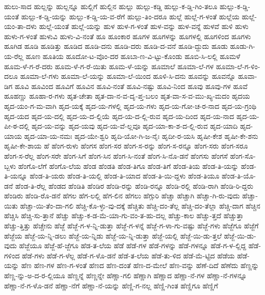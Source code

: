 {ಹುಲು-ಸಾದ
ಹುಲ್ಲನ್ನು
ಹುಲ್ಲನ್ನೂ
ಹುಲ್ಲಿಗೆ
ಹುಲ್ಲಿನ
ಹುಲ್ಲು
ಹುಲ್ಲು-ಕಡ್ಡಿ
ಹುಲ್ಲು-ಕ-ಡ್ಡಿ-ಗಿಂ-ತಲೂ
ಹುಲ್ಲು-ಕ-ಡ್ಡಿ-ಯಂತೆ
ಹುಲ್ಲು-ಕ-ಡ್ಡಿ-ಯನ್ನು
ಹುಲ್ಲು-ಕ-ಡ್ಡಿ-ಯ-ವ-ರೆಗೆ
ಹುಲ್ಲು-ತಿಂ-ದರೂ
ಹುಲ್ಲೆ
ಹುಲ್ಲೆ-ಗ-ಳಂತೆ
ಹುಲ್ಲೆಯ
ಹುಲ್ಲೆ-ಯಂ-ತಾ-ದಳು
ಹುಲ್ಲೆ-ಯಂತೆ
ಹುಲ್ಲೆ-ಯನ್ನು
ಹುಳ
ಹುಳ-ಗ-ಳಂತೆ
ಹುಳ-ವನ್ನು
ಹುಳ-ವನ್ನೆ
ಹುಳವೆ
ಹುಳಿ
ಹುಳು
ಹುಳು-ಗ-ಳಂತೆ
ಹುಳುವಿ
ಹುಳು-ವಿ-ನಂತೆ
ಹೂ
ಹೂಂಕಾರ
ಹೂಗಳ
ಹೂಗಳನ್ನು
ಹೂಗಳಲ್ಲಿ
ಹೂಗಳಿಂದ
ಹೂಗಳು
ಹೂಗಿಡ
ಹೂಡಿ
ಹೂಡಿತ್ತು
ಹೂಡಿದ
ಹೂಡಿ-ದನು
ಹೂಡಿ-ದರು
ಹೂಡಿ-ದ-ವನೆ
ಹೂಡಿ-ದ್ದುದು
ಹೂಡು
ಹೂಡು-ಗಿ-ಯ-ರೆಲ್ಲ
ಹೂಣ
ಹೂತಿಯ
ಹೂದೋ-ಟ-ವೊಂ-ದರ
ಹೂಬಾ-ಣ-ವಿ-ಟ್ಟು-ಕೊಂಡು
ಹೂಬಿ-ಸಿ-ಲಲ್ಲಿ
ಹೂಮಳೆ
ಹೂಮ-ಳೆ-ಗ-ರೆ-ದರು
ಹೂಮ-ಳೆ-ಗ-ರೆ-ಯಿತು
ಹೂಮ-ಳೆ-ಯನ್ನು
ಹೂಮಾಲೆ
ಹೂಮಾ-ಲೆ-ಗಳ
ಹೂಮಾ-ಲೆ-ಗ-ಳಿಂ-ದಲೂ
ಹೂಮಾ-ಲೆ-ಗಳು
ಹೂಮಾ-ಲೆ-ಯನ್ನು
ಹೂಮಾ-ಲೆ-ಯಿಂದ
ಹೂಳಿ-ಸಿ-ದನು
ಹೂವನ್ನು
ಹೂವನ್ನೊ
ಹೂವಾ-ಡಿಗ
ಹೂವಿ
ಹೂವಿಂದ
ಹೂವಿಗೆ
ಹೂವಿನ
ಹೂವಿ-ನಂತೆ
ಹೂವಿ-ನಷ್ಟು
ಹೂವಿ-ನಿಂದ
ಹೂವು
ಹೂವು-ಗಳ
ಹೂವೆ
ಹೂಹಣ್ಣು
ಹೂಹಾ-ರ-ಗಳು
ಹೃತ-ಚೇತಾ
ಹೃತ-ದಾ-ನ-ವ-ದೃ-ಪ್ತ-ಬಲಂ
ಹೃತ-ವಾ-ಸ-ವ-ಮು-ಖ್ಯ-ಮದಂ
ಹೃದಯ
ಹೃದ-ಯಂ-ಗ-ಮ-ವಾಗಿ
ಹೃದ-ಯಕ್ಕೆ
ಹೃದ-ಯ-ಗಳಲ್ಲಿ
ಹೃದ-ಯ-ಗಳು
ಹೃದ-ಯ-ಗೋ-ಚ-ರ-ನಾದ
ಹೃದ-ಯ-ಗ್ರಂಥಿ
ಹೃದ-ಯದ
ಹೃದ-ಯ-ದಲ್ಲಿ
ಹೃದ-ಯ-ದ-ಲ್ಲಿಯೆ
ಹೃದ-ಯ-ದ-ಲ್ಲಿ-ರುವ
ಹೃದ-ಯ-ದಿಂದ
ಹೃದ-ಯ-ನಾದ
ಹೃದ-ಯ-ಪೀ-ಠ-ದಲ್ಲಿ
ಹೃದ-ಯ-ವನ್ನು
ಹೃದ-ಯವು
ಹೃದ-ಯ-ವೆ-ಲ್ಲವೂ
ಹೃದ-ಯಾ-ಕಾ-ಶ-ದ-ಲ್ಲಿ-ರುವ
ಹೃದ-ಯಾದಿ
ಹೃದ-ಯಾಯ
ಹೃದ-ಯಾ-ಯ-ನಮಃ
ಹೃದ-ಯೇ-ಶ್ವರಿ
ಹೃದಿ-ಯೋ-ಗಿ-ಜ-ನೈಃ
ಹೃದೀ-ರ-ಯಸಿ
ಹೃಷೀ-ಕೇಶ
ಹೃಷೀ-ಕೇ-ಶನು
ಹೃಷೀ-ಕೇ-ಶಾಯ
ಹೆ
ಹೆಂಗ-ರುಳು
ಹೆಂಗಸ
ಹೆಂಗ-ಸರ
ಹೆಂಗ-ಸ-ರನ್ನು
ಹೆಂಗ-ಸ-ರನ್ನೂ
ಹೆಂಗ-ಸರು
ಹೆಂಗ-ಸರೂ
ಹೆಂಗ-ಸ-ರೆಲ್ಲ
ಹೆಂಗ-ಸರೇ
ಹೆಂಗ-ಸಿಗೆ
ಹೆಂಗ-ಸಿನ
ಹೆಂಗ-ಸಿ-ನಂತೆ
ಹೆಂಗ-ಸಿ-ನೊ-ಡನೆ
ಹೆಂಗಸು
ಹೆಂಗಸೆ
ಹೆಂಗ-ಸೊ-ಬ್ಬಳು
ಹೆಂಗೊ-ಲೆಗೆ
ಹೆಂಗೊ-ಲೆಯ
ಹೆಂಡ
ಹೆಂಡತಿ
ಹೆಂಡ-ತಿಗೂ
ಹೆಂಡ-ತಿಗೆ
ಹೆಂಡ-ತಿಯ
ಹೆಂಡ-ತಿ-ಯನ್ನು
ಹೆಂಡ-ತಿ-ಯನ್ನೂ
ಹೆಂಡ-ತಿ-ಯರು
ಹೆಂಡ-ತಿ-ಯಲ್ಲಿ
ಹೆಂಡ-ತಿ-ಯಾದ
ಹೆಂಡ-ತಿ-ಯಿ-ದ್ದಳು
ಹೆಂಡ-ತಿಯೂ
ಹೆಂಡ-ತಿ-ಯೊ-ಡನೆ
ಹೆಂಡ-ತಿ-ರೆಲ್ಲ
ಹೆಂಡದ
ಹೆಂಡಿತಿ
ಹೆಂಡಿರ
ಹೆಂಡಿ-ರನ್ನು
ಹೆಂಡಿ-ರನ್ನೂ
ಹೆಂಡಿ-ರಲ್ಲಿ
ಹೆಂಡಿ-ರಾಗಿ
ಹೆಂಡಿ-ರಿ-ದ್ದರು
ಹೆಂಡಿರು
ಹೆಂಡಿ-ರೊ-ಡನೆ
ಹೆಗಲ
ಹೆಗ-ಲಲ್ಲಿ
ಹೆಗ-ಲಿನ
ಹೆಗಲು
ಹೆಗ್ಗುರಿ
ಹೆಚ್ಚಾ
ಹೆಚ್ಚಾಗಿ
ಹೆಚ್ಚಾ-ಗಿ-ರು-ವುದು
ಹೆಚ್ಚಾ-ಯಿತು
ಹೆಚ್ಚಾ-ಯಿ-ತೆಂ-ದಾ-ಗಲಿ
ಹೆಚ್ಚಿ-ಕೊ-ಳ್ಳು-ವು-ದಕ್ಕೆ
ಹೆಚ್ಚಿತು
ಹೆಚ್ಚಿ-ದಂ-ತೆಲ್ಲ
ಹೆಚ್ಚಿ-ದಂ-ತೆಲ್ಲಾ
ಹೆಚ್ಚಿ-ದಾಗ
ಹೆಚ್ಚಿನ
ಹೆಚ್ಚಿಸಿ
ಹೆಚ್ಚಿ-ಸು-ತ್ತಾನೆ
ಹೆಚ್ಚು
ಹೆಚ್ಚು-ಕ-ಡ-ಮೆ-ಯಾ-ಗು-ವಂ-ತ-ಹು-ದಲ್ಲ
ಹೆಚ್ಚು-ಕಾಲ
ಹೆಚ್ಚು-ತ್ತದೆ
ಹೆಚ್ಚುತ್ತಾ
ಹೆಚ್ಚು-ತ್ತಿತ್ತು
ಹೆಚ್ಚೇನು
ಹೆಜ್ಜೆ
ಹೆಜ್ಜೆ-ಗ-ಳ-ನ್ನಿ-ಡುತ್ತಾ
ಹೆಜ್ಜೆ-ಗ-ಳನ್ನೆ
ಹೆಜ್ಜೆ-ಗ-ಳಾ-ಗು-ವಷ್ಟು
ಹೆಜ್ಜೆ-ಗಳು
ಹೆಜ್ಜೆಗೂ
ಹೆಜ್ಜೆಗೆ
ಹೆಜ್ಜೆಯ
ಹೆಜ್ಜೆ-ಯ-ನ್ನಿ-ಡಲು
ಹೆಜ್ಜೆ-ಯ-ನ್ನಿಡು
ಹೆಜ್ಜೆ-ಯ-ನ್ನಿ-ಡುತ್ತಾ
ಹೆಜ್ಜೆ-ಯಲ್ಲಿ
ಹೆಜ್ಜೆ-ಯಿ-ಡು-ತ್ತಲೆ
ಹೆಜ್ಜೆ-ಯಿ-ಡು-ವುದು
ಹೆಜ್ಜೆಯೂ
ಹೆಜ್ಜೆ-ಹೆ-ಜ್ಜೆಗೂ
ಹೆಡ-ತ-ಲೆಯ
ಹೆಡೆ
ಹೆಡೆ-ಗಳ
ಹೆಡೆ-ಗಳನ್ನು
ಹೆಡೆ-ಗಳನ್ನೂ
ಹೆಡೆ-ಗ-ಳ-ಲ್ಲಿದ್ದ
ಹೆಡೆ-ಗಳಿಂದ
ಹೆಡೆ-ಗಳು
ಹೆಡೆ-ಗ-ಳೆಲ್ಲ
ಹೆಡೆ-ಗ-ಳೊ-ಡನೆ
ಹೆಡೆ-ತ-ಲೆಯ
ಹೆಡೆ-ತು-ಳಿದ
ಹೆಡೆ-ಮೆ-ಟ್ಟಿದ
ಹೆಡೆಯ
ಹೆಡೆ-ಯನ್ನು
ಹೆಣ
ಹೆಣ-ಗಳ
ಹೆಣ-ಗ-ಳಂತೆ
ಹೆಣದ
ಹೆಣ-ದಂತೆ
ಹೆಣ-ದ-ಮೇಲೆ
ಹೆಣ-ವನ್ನು
ಹೆಣೆ-ದಿದೆ
ಹೆಣೆದು
ಹೆಣ್ಣನ್ನು
ಹೆಣ್ಣ-ನ್ನು-ಅ-ದ-ರ-ಲ್ಲಿಯೂ
ಹೆಣ್ಣನ್ನೆ
ಹೆಣ್ಣನ್ನೇ
ಹೆಣ್ಣಾ-ಗಲಿ
ಹೆಣ್ಣಾಗಿ
ಹೆಣ್ಣಾದ
ಹೆಣ್ಣಾ-ನೆ-ಗಳ
ಹೆಣ್ಣಾ-ನೆ-ಗಳನ್ನೂ
ಹೆಣ್ಣಾ-ನೆ-ಗ-ಳೊ-ಡನೆ
ಹೆಣ್ಣಾ-ನೆಗೆ
ಹೆಣ್ಣಾ-ನೆ-ಯನ್ನು
ಹೆಣ್ಣಿ-ಗ-ನಲ್ಲ
ಹೆಣ್ಣಿ-ಗಿಂತ
ಹೆಣ್ಣಿಗೂ
ಹೆಣ್ಣಿಗೆ
}
